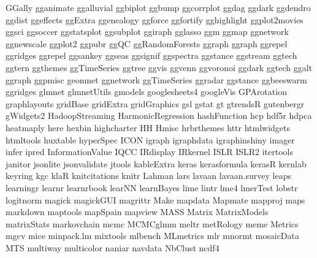 \documentclass[10pt]{article} %
\begin{document}
\begin{itemize}
      GGally
      gganimate
      ggalluvial
      ggbiplot
      ggbump
      ggcorrplot
      ggdag
      ggdark
      ggdendro
      ggdist
      ggeffects
      ggExtra
      ggenealogy
      ggforce
      ggfortify
      gghighlight
      ggplot2movies
      ggsci
      ggsoccer
      ggstatsplot
      ggsubplot
      ggiraph
      gglasso
      ggm
      ggmap
      ggnetwork
      ggnewscale
      ggplot2
      ggpubr
      ggQC
      ggRandomForests
      ggraph
      ggraph
      ggrepel
      ggridges
      ggrepel
      ggsankey
      ggseas
      ggsignif
      ggspectra
      ggstance
      ggstream
      ggtech
      ggtern
      ggthemes
      ggTimeSeries
      ggtree
      ggvis
      ggvenn
      ggvoronoi
      ggdark
      ggtech
      ggalt
      ggraph
      ggpmisc
      geomnet
      ggnetwork
      ggTimeSeries
      ggradar
      ggstance
      ggbeeswarm
      ggridges
      glmnet
      glmnetUtils
      gmodels
      googlesheets4
      googleVis
      GPArotation
      graphlayouts
      gridBase
      gridExtra
      gridGraphics
      gsl
      gstat
      gt
      gtrendsR
      gutenbergr
      gWidgets2
      HadoopStreaming
      HarmonicRegression
      hashFunction
      hcp
      hdf5r
      hdpca
      heatmaply
      here
      hexbin
      highcharter
      HH
      Hmisc
      hrbrthemes
      httr
      htmlwidgets
      htmltools
      huxtable
      hyperSpec
      ICON
      igraph
      igraphdata
      igraphinshiny
      imager
      infer
      ipred
      InformationValue
      IQCC
      IRdisplay
      IRkernel
      ISLR
      ISLR2
      itertools
      janitor
      jsonlite
      jsonvalidate
      jtools
      kableExtra
      keras
      kerasformula
      kerasR
      kernlab
      keyring
      kgc
      klaR
      knitcitations
      knitr
      Lahman
      lars
      lavaan
      lavaan.survey
      leaps
      learningr
      learnr
      learnrbook
      learNN
      learnBayes
      lime
      lintr
      lme4
      lmerTest
      lobstr
      logitnorm
      magick
      magickGUI
      magrittr
      Make
      mapdata
      Mapmate
      mapproj
      maps
      markdown
      maptools
      mapSpain
      mapview
      MASS
      Matrix
      MatrixModels
      matrixStats
      markovchain
      mcmc
      MCMCglmm
      meltr
      metRology
      meme
      Metrics
      mgcv
      mice
      minpack.lm
      mixtools
      mlbench
      MLmetrics
      mlr
      mnormt
      mosaicData
      MTS
      multiway
      multicolor
      naniar
      navdata
      NbClust
      ncdf4

\end{itemize}
\end{document}
